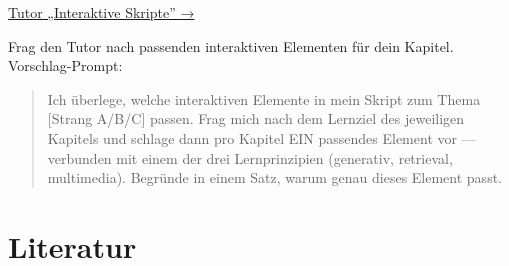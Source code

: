 \documentclass[
  ngerman,
  a4paper,
  DIV=11]{scrreprt}
\begin{document}
\begin{tcolorbox}[enhanced jigsaw, opacitybacktitle=0.6, leftrule=.75mm, title=\textcolor{quarto-callout-tip-color}{\faLightbulb}\hspace{0.5em}{Tutor öffnen}, colframe=quarto-callout-tip-color-frame, arc=.35mm, toprule=.15mm, colbacktitle=quarto-callout-tip-color!10!white, bottomrule=.15mm, colback=white, rightrule=.15mm, breakable, toptitle=1mm, bottomtitle=1mm, opacityback=0, titlerule=0mm, coltitle=black, left=2mm]

\href{https://chatgpt.com/g/g-69fec93348108191af1ffb8ce0cf6712-tutor-interaktive-skripte}{Tutor
„Interaktive Skripte'' →}

Frag den Tutor nach passenden interaktiven Elementen für dein Kapitel.
Vorschlag-Prompt:

\begin{quote}
Ich überlege, welche interaktiven Elemente in mein Skript zum Thema
{[}Strang A/B/C{]} passen. Frag mich nach dem Lernziel des jeweiligen
Kapitels und schlage dann pro Kapitel EIN passendes Element vor ---
verbunden mit einem der drei Lernprinzipien (generativ, retrieval,
multimedia). Begründe in einem Satz, warum genau dieses Element passt.
\end{quote}

\end{tcolorbox}

\chapter*{Literatur}\label{literatur}

\end{document}
